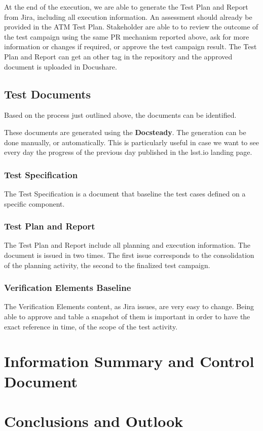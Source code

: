 At the end of the execution, we are able to generate the Test Plan and Report from Jira, including all execution information.
An assessment should already be provided in the ATM Test Plan.
Stakeholder are able to to review the outcome of the test campaign using the same PR mechanism reported above, ask for more information or changes if required, 
or approve the test campaign result.
The Test Plan and Report can get an other tag in the repository and the approved document is uploaded in Docushare.


\subsection{Test Documents}

Based on the process just outlined above, the documents can be identified.

These documents are generated using the \textbf{Docsteady}.
The generation can be done manually, or automatically.
This is particularly useful in case we want to see every day the progress of the previous day published in the lsst.io landing page.


\subsubsection{Test Specification}

The Test Specification is a document that baseline the test cases defined on a specific component.


\subsubsection{Test Plan and Report}

The Test Plan and Report include all planning and execution information. 
The document  is issued in two times. The first issue corresponds to the consolidation of the planning activity, 
the second to the finalized test campaign.


\subsubsection{Verification Elements Baseline}

The Verification Elements content, as Jira issues, are very easy to change.
Being able to approve and table a snapshot of them is important in order to have the exact reference in time,
of the scope of the test activity.


\section{Information Summary and Control Document}




\section{Conclusions and Outlook}





